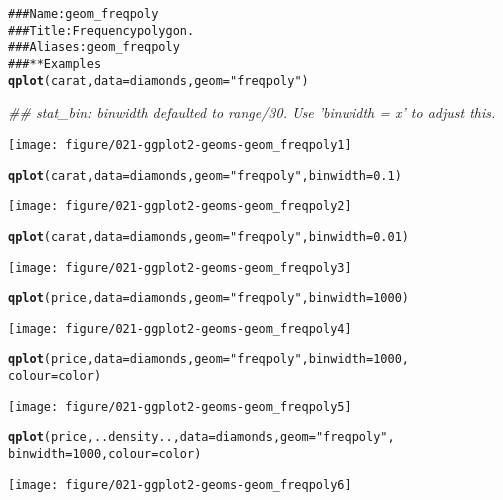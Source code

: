 \documentclass[a4paper,titlepage]{tufte-handout}\usepackage{graphicx, color}
\makeatletter
\def\maxwidth{ %
  \ifdim\Gin@nat@width>\linewidth
    \linewidth
  \else
    \Gin@nat@width
  \fi
}
\newcommand{\hlfunctioncall}[1]{\textcolor[rgb]{0.501960784313725,0,0.329411764705882}{\textbf{#1}}}%
\newcommand{\hlstring}[1]{\textcolor[rgb]{0.6,0.6,1}{#1}}%
\newcommand{\hlcomment}[1]{\textcolor[rgb]{0.180392156862745,0.6,0.341176470588235}{#1}}%
\newenvironment{kframe}{%
 \def\at@end@of@kframe{}%
 \ifinner\ifhmode%
  \def\at@end@of@kframe{\end{minipage}}%
  \begin{minipage}{\columnwidth}%
 \fi\fi%
 \def\FrameCommand##1{\hskip\@totalleftmargin \hskip-\fboxsep
 \colorbox{shadecolor}{##1}\hskip-\fboxsep
     \hskip-\linewidth \hskip-\@totalleftmargin \hskip\columnwidth}%
 \MakeFramed {\advance\hsize-\width
   \@totalleftmargin\z@ \linewidth\hsize
   \@setminipage}}%
 {\par\unskip\endMakeFramed%
 \at@end@of@kframe}
\newenvironment{knitrout}{}{} %
\makeatother
\begin{document}
\begin{knitrout}
\color{fgcolor}\begin{kframe}
\begin{alltt}
\hlcomment{### Name: geom_freqpoly}
\hlcomment{### Title: Frequency polygon.}
\hlcomment{### Aliases: geom_freqpoly}
\hlcomment{### ** Examples}
\hlfunctioncall{qplot}(carat, data = diamonds, geom = \hlstring{"freqpoly"})
\end{alltt}


{\ttfamily\noindent\itshape\textcolor{messagecolor}{\#\# stat\_bin: binwidth defaulted to range/30. Use 'binwidth = x' to adjust this.}}\end{kframe}\texttt{[image: figure/021-ggplot2-geoms-geom\_freqpoly1]} \begin{kframe}\begin{alltt}
\hlfunctioncall{qplot}(carat, data = diamonds, geom = \hlstring{"freqpoly"}, binwidth = 0.1)
\end{alltt}
\end{kframe}\texttt{[image: figure/021-ggplot2-geoms-geom\_freqpoly2]} \begin{kframe}\begin{alltt}
\hlfunctioncall{qplot}(carat, data = diamonds, geom = \hlstring{"freqpoly"}, binwidth = 0.01)
\end{alltt}
\end{kframe}\texttt{[image: figure/021-ggplot2-geoms-geom\_freqpoly3]} \begin{kframe}\begin{alltt}
\hlfunctioncall{qplot}(price, data = diamonds, geom = \hlstring{"freqpoly"}, binwidth = 1000)
\end{alltt}
\end{kframe}\texttt{[image: figure/021-ggplot2-geoms-geom\_freqpoly4]} \begin{kframe}\begin{alltt}
\hlfunctioncall{qplot}(price, data = diamonds, geom = \hlstring{"freqpoly"}, binwidth = 1000,
  colour = color)
\end{alltt}
\end{kframe}\texttt{[image: figure/021-ggplot2-geoms-geom\_freqpoly5]} \begin{kframe}\begin{alltt}
\hlfunctioncall{qplot}(price, ..density.., data = diamonds, geom = \hlstring{"freqpoly"},
  binwidth = 1000, colour = color)
\end{alltt}
\end{kframe}\texttt{[image: figure/021-ggplot2-geoms-geom\_freqpoly6]} 
\end{knitrout}
\end{document}
